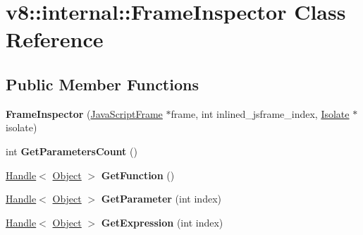 \hypertarget{classv8_1_1internal_1_1_frame_inspector}{}\section{v8\+:\+:internal\+:\+:Frame\+Inspector Class Reference}
\label{classv8_1_1internal_1_1_frame_inspector}
\subsection*{Public Member Functions}
\begin{DoxyCompactItemize}
\item 
{\bfseries Frame\+Inspector} (\hyperlink{classv8_1_1internal_1_1_java_script_frame}{Java\+Script\+Frame} $\ast$frame, int inlined\+\_\+jsframe\+\_\+index, \hyperlink{classv8_1_1internal_1_1_isolate}{Isolate} $\ast$isolate)\hypertarget{classv8_1_1internal_1_1_frame_inspector_acfb4607583dd9db87a771e5f0fe1a6bf}{}\label{classv8_1_1internal_1_1_frame_inspector_acfb4607583dd9db87a771e5f0fe1a6bf}

\item 
int {\bfseries Get\+Parameters\+Count} ()\hypertarget{classv8_1_1internal_1_1_frame_inspector_ae868bb8c10b97fe67ac25db4931acdf1}{}\label{classv8_1_1internal_1_1_frame_inspector_ae868bb8c10b97fe67ac25db4931acdf1}

\item 
\hyperlink{classv8_1_1internal_1_1_handle}{Handle}$<$ \hyperlink{classv8_1_1internal_1_1_object}{Object} $>$ {\bfseries Get\+Function} ()\hypertarget{classv8_1_1internal_1_1_frame_inspector_acce2df7e952f66ca5571f070ad991c48}{}\label{classv8_1_1internal_1_1_frame_inspector_acce2df7e952f66ca5571f070ad991c48}

\item 
\hyperlink{classv8_1_1internal_1_1_handle}{Handle}$<$ \hyperlink{classv8_1_1internal_1_1_object}{Object} $>$ {\bfseries Get\+Parameter} (int index)\hypertarget{classv8_1_1internal_1_1_frame_inspector_a2c78de0af75bd24c129831a2b6d10772}{}\label{classv8_1_1internal_1_1_frame_inspector_a2c78de0af75bd24c129831a2b6d10772}

\item 
\hyperlink{classv8_1_1internal_1_1_handle}{Handle}$<$ \hyperlink{classv8_1_1internal_1_1_object}{Object} $>$ {\bfseries Get\+Expression} (int index)\hypertarget{classv8_1_1internal_1_1_frame_inspector_a7bb13f786091a9a020b1f40191a3cd8d}{}\label{classv8_1_1internal_1_1_frame_inspector_a7bb13f786091a9a020b1f40191a3cd8d}


\end{DoxyCompactItemize}
